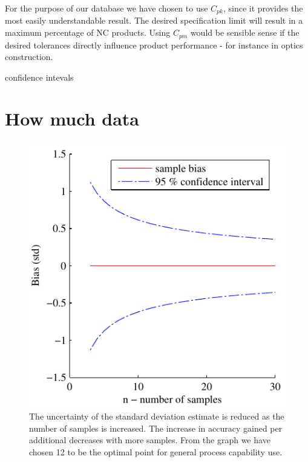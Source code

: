 \documentclass[aip,amsmath, reprint, author-year]{revtex4-1}
\begin{document}
For the purpose of our database we have chosen to use $C_{pk}$, since it provides the most easily understandable result. The desired specification limit will result in a maximum percentage of NC products. Using $C_{pm}$ would be sensible sense if the desired tolerances directly influence product performance - for instance in optics construction.  




\cite{tang1997graphical}


confidence intevals

\section{How much data}


\begin{figure}
\includegraphics{stats_bias_confidence.pdf}
\caption{\label{fig:std_uncertainty}The uncertainty of the standard deviation estimate is reduced as the number of samples is increased. The increase in accuracy gained per additional decreases with more samples. From the graph we have chosen 12 to be the optimal point for general process capability use.}
\end{figure}
\end{document}
